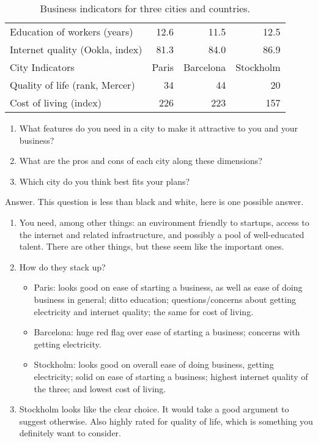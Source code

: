 \begin{enumerate}
{\begin{table}[h]
\begin{tabular}{lrrr}
Education of workers (years) &  12.6  &  11.5  &  12.5  \\
Internet quality (Ookla, index)    &  81.3  &  84.0  &  86.9 \\
\midrule
City Indicators & Paris  & Barcelona  & Stockholm  \\
\midrule
Quality of life (rank, Mercer)  &  34  &  44  &  20  \\
Cost of living (index)          & 226  & 223  &  157 \\
\bottomrule
\end{tabular}
\caption{Business indicators for three cities and countries.}
\label{tab:cities}
\end{table}
} 
%
\begin{enumerate}
\item What features do you need in a city to make it attractive to you and your business?
\item What are the pros and cons of each city along these dimensions?
\item Which city do you think best fits your plans?
\end{enumerate}

Answer.  
This question is less than black and white, here is one possible answer.
%
\begin{enumerate}
\item You need, among other things:  an environment friendly to startups,
access to the internet and related infrastructure,
and possibly a pool of well-educated talent.
There are other things, but these seem like the important ones.

\item How do they stack up?
\begin{itemize}
\item Paris:  looks good on ease of starting a business, as well
as ease of doing business in general; ditto education;
questions/concerns about getting electricity and internet quality;
the same for cost of living.
\item Barcelona:  huge red flag over ease of starting a business;
concerns with getting electricity.
\item Stockholm:  looks good on overall ease of doing business,
getting electricity;
solid on ease of starting a business;
highest internet quality of the three;
and lowest cost of living.
\end{itemize}

\item Stockholm looks like the clear choice.
It would take a good argument to suggest otherwise.
Also highly rated for quality of life, which is something
you definitely want to consider.


\end{enumerate}
\end{enumerate}
